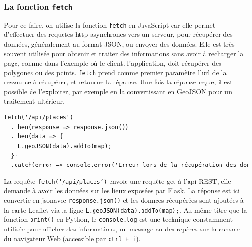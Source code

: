 \subsubsection{La fonction \texttt{fetch}}
Pour ce faire, on utilise la fonction \texttt{fetch} en JavaScript car elle permet d'effectuer des requêtes \acrshort{http} asynchrones vers un serveur, pour récupérer des données, généralement au format JSON, ou envoyer des données. Elle est très souvent utilisée pour obtenir et traiter des informations sans avoir à recharger la page, comme dans l'exemple où le client, l'application, doit récupérer des polygones ou des points. \texttt{fetch} prend comme premier paramètre l'\acrshort{url} de la ressource à récupérer, et retourne la réponse. Une fois la réponse reçue, il est possible de l'exploiter, par exemple en la convertissant en GeoJSON pour un traitement ultérieur. 
\begin{lstlisting}[language=HTML, caption=Exemple d'utilisation de la fonction fetch]
fetch('/api/places')
  .then(response => response.json()) 
  .then(data => {
    L.geoJSON(data).addTo(map); 
  })
  .catch(error => console.error('Erreur lors de la récupération des données:', error));
\end{lstlisting}

La requête \texttt{fetch('/api/places')} envoie une requête \acrshort{get} à l'\acrshort{api} REST, elle demande à avoir les données sur les lieux exposées par Flask. La réponse est ici convertie en \acrshort{json}avec \texttt{response.json()} et les données récupérées sont ajoutées à la carte Leaflet via la ligne \texttt{L.geoJSON(data).addTo(map);}. Au même titre que la fonction \texttt{print()} en Python, le \texttt{console.log} est une technique constamment utilisée pour afficher des informations, un message ou des repères sur la console du navigateur Web (accessible par \texttt{ctrl + i}).

